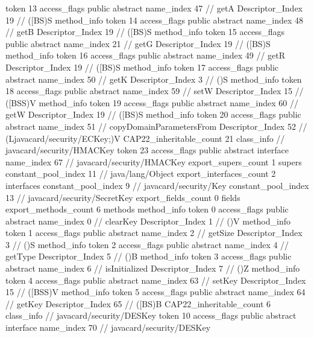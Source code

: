 {{{{{					token	13
					access_flags	public abstract
					name_index	47		// getA
					Descriptor_Index	19		// ([BS)S
				}
				method_info {
					token	14
					access_flags	public abstract
					name_index	48		// getB
					Descriptor_Index	19		// ([BS)S
				}
				method_info {
					token	15
					access_flags	public abstract
					name_index	21		// getG
					Descriptor_Index	19		// ([BS)S
				}
				method_info {
					token	16
					access_flags	public abstract
					name_index	49		// getR
					Descriptor_Index	19		// ([BS)S
				}
				method_info {
					token	17
					access_flags	public abstract
					name_index	50		// getK
					Descriptor_Index	3		// ()S
				}
				method_info {
					token	18
					access_flags	public abstract
					name_index	59		// setW
					Descriptor_Index	15		// ([BSS)V
				}
				method_info {
					token	19
					access_flags	public abstract
					name_index	60		// getW
					Descriptor_Index	19		// ([BS)S
				}
				method_info {
					token	20
					access_flags	public abstract
					name_index	51		// copyDomainParametersFrom
					Descriptor_Index	52		// (Ljavacard/security/ECKey;)V
				}
			}
			CAP22_inheritable_count	21
		}
		class_info {		// javacard/security/HMACKey
			token	23
			access_flags	public abstract interface
			name_index	67		// javacard/security/HMACKey
			export_supers_count	1
			supers {
				constant_pool_index	11		// java/lang/Object
			}
			export_interfaces_count	2
			interfaces {
				constant_pool_index	9		// javacard/security/Key
				constant_pool_index	13		// javacard/security/SecretKey
			}
			export_fields_count	0
			fields {
			}
			export_methods_count	6
			methods {
				method_info {
					token	0
					access_flags	public abstract
					name_index	0		// clearKey
					Descriptor_Index	1		// ()V
				}
				method_info {
					token	1
					access_flags	public abstract
					name_index	2		// getSize
					Descriptor_Index	3		// ()S
				}
				method_info {
					token	2
					access_flags	public abstract
					name_index	4		// getType
					Descriptor_Index	5		// ()B
				}
				method_info {
					token	3
					access_flags	public abstract
					name_index	6		// isInitialized
					Descriptor_Index	7		// ()Z
				}
				method_info {
					token	4
					access_flags	public abstract
					name_index	63		// setKey
					Descriptor_Index	15		// ([BSS)V
				}
				method_info {
					token	5
					access_flags	public abstract
					name_index	64		// getKey
					Descriptor_Index	65		// ([BS)B
				}
			}
			CAP22_inheritable_count	6
		}
		class_info {		// javacard/security/DESKey
			token	10
			access_flags	public abstract interface
			name_index	70		// javacard/security/DESKey
}}}
